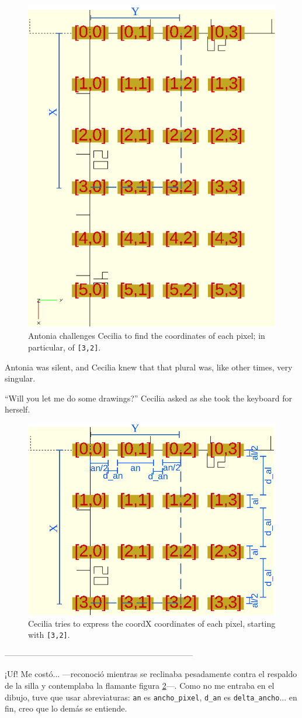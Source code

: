 \begin{figure}[ht]
  \centering
  \includegraphics[width=.42\textwidth]{imagenes/matriz-coordenadas-1}
  \caption{Antonia challenges Cecilia to find the coordinates
  of each pixel; in particular, of \texttt{[3,2]}.}
  \label{fig:matriz-coordenadas-1}
\end{figure}

Antonia was silent, and Cecilia knew that that plural was, like other times, very singular.

``Will you let me do some drawings?'' Cecilia asked as she took the keyboard for herself.

\begin{figure}[ht]
  \centering
  \includegraphics[width=.6\textwidth]{imagenes/matriz-coordenadas-4.png}
  \caption{Cecilia tries to express the coord{X}   coordinates of
each pixel, starting with \texttt{[3,2]}.}
  \label{fig:matriz-coordenadas-4}
\end{figure}

---------------------------------------------------------------------

\guillemotright ¡Uf! Me costó... ---reconoció mientras se reclinaba
pesadamente contra el respaldo de la silla y contemplaba la flamante
figura \ref{fig:matriz-coordenadas-4}---. Como no me entraba en el
dibujo, tuve que usar abreviaturas: \texttt{an} es
\texttt{ancho\_pixel}, \texttt{d\_an} es \texttt{delta\_ancho}... en
fin, creo que lo demás se entiende.

